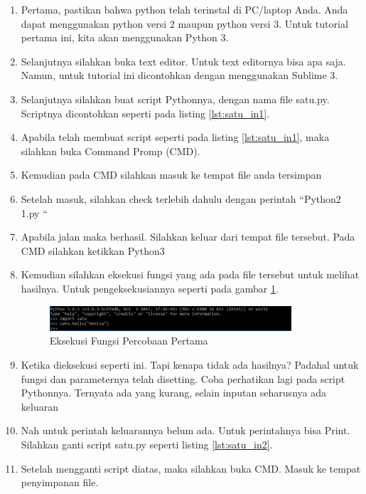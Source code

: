\begin{enumerate}
\item Pertama, pastikan bahwa python telah terinstal di PC/laptop Anda. Anda dapat menggunakan python versi 2 maupun python versi 3. Untuk tutorial pertama ini, kita akan menggunakan Python 3.
\item Selanjutnya silahkan buka text editor. Untuk text editornya bisa apa saja. Namun, untuk tutorial ini dicontohkan dengan menggunakan Sublime 3.
\item Selanjutnya silahkan buat script Pythonnya, dengan nama file satu.py. Scriptnya dicontohkan seperti pada listing \ref{lst:satu_in1}.

\item Apabila telah membuat script seperti pada listing \ref{lst:satu_in1}, maka silahkan buka Command Promp (CMD).
\item Kemudian pada CMD silahkan masuk ke tempat file anda tersimpan
\item Setelah masuk, silahkan check terlebih dahulu dengan perintah “Python2 1.py “
\item Apabila jalan maka berhasil. Silahkan keluar dari tempat file tersebut. Pada CMD silahkan ketikkan Python3
\item Kemudian silahkan eksekusi fungsi yang ada pada file tersebut untuk melihat hasilnya. Untuk pengeksekusiannya seperti pada gambar \ref{fig:eksekusi_fungsi1}.
\begin{figure}[!htbp]
	\centerline{\includegraphics[width=0.85\textwidth]{figures/8/eksekusi_fungsi1.png}}
	\caption{Eksekusi Fungsi Percobaan Pertama}
	\label{fig:eksekusi_fungsi1}
\end{figure} 
\item Ketika dieksekusi seperti ini. Tapi kenapa tidak ada hasilnya? Padahal untuk fungsi dan parameternya telah disetting. Coba perhatikan lagi pada script Pythonnya. Ternyata ada yang kurang, selain inputan seharusnya ada keluaran
\item Nah untuk perintah keluarannya belum ada. Untuk perintahnya bisa Print. Silahkan ganti script satu.py seperti listing \ref{lst:satu_in2}.

\item Setelah mengganti script diatas, maka silahkan buka CMD. Masuk ke tempat penyimpanan file.

\end{enumerate}
